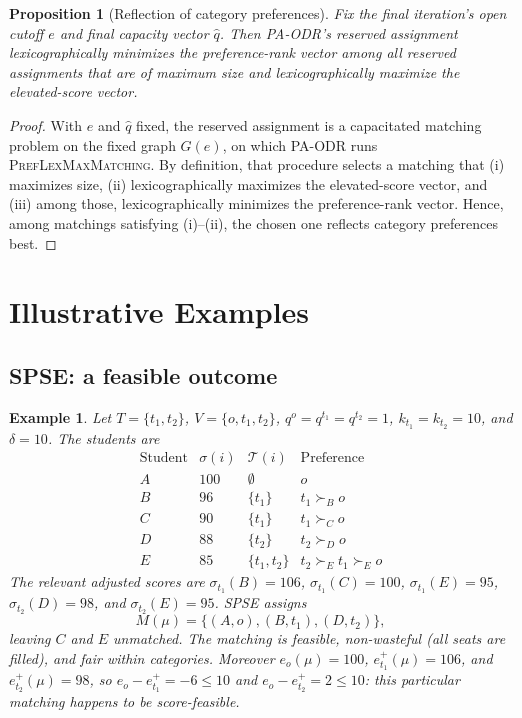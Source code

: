 \documentclass[10pt]{article}
\newtheorem{proposition}{Proposition}
\newtheorem{example}{Example}
\newcommand{\T}{\mathcal{T}}
\newcommand{\1}{\mathbf{1}}
\begin{document}
\begin{proposition}[Reflection of category preferences]
\label{prop:pa-odr-preference}
Fix the final iteration's open cutoff $e$ and final capacity vector $\hat q$. Then PA-ODR's reserved assignment lexicographically minimizes the preference-rank vector among all reserved assignments that are of maximum size and lexicographically maximize the elevated-score vector.
\end{proposition}

\begin{proof}
With $e$ and $\hat q$ fixed, the reserved assignment is a capacitated matching problem on the fixed graph $G(e)$, on which PA-ODR runs \textsc{PrefLexMaxMatching}. By definition, that procedure selects a matching that (i) maximizes size, (ii) lexicographically maximizes the elevated-score vector, and (iii) among those, lexicographically minimizes the preference-rank vector. Hence, among matchings satisfying (i)--(ii), the chosen one reflects category preferences best.
\end{proof}

\section{Illustrative Examples}

\subsection{SPSE: a feasible outcome}

\begin{example}
Let $T=\{t_1,t_2\}$, $V=\{o,t_1,t_2\}$, $q^o=q^{t_1}=q^{t_2}=1$, $k_{t_1}=k_{t_2}=10$, and $\delta=10$. The students are
\[
\begin{array}{c|c|c|c}
\text{Student} & \sigma(i) & \T(i) & \text{Preference} \\
\hline
A & 100 & \emptyset & o \\
B & 96 & \{t_1\} & t_1\succ_B o \\
C & 90 & \{t_1\} & t_1\succ_C o \\
D & 88 & \{t_2\} & t_2\succ_D o \\
E & 85 & \{t_1,t_2\} & t_2\succ_E t_1\succ_E o
\end{array}
\]
The relevant adjusted scores are $\sigma_{t_1}(B)=106$, $\sigma_{t_1}(C)=100$, $\sigma_{t_1}(E)=95$, $\sigma_{t_2}(D)=98$, and $\sigma_{t_2}(E)=95$. SPSE assigns
\[
M(\mu)=\{(A,o),(B,t_1),(D,t_2)\},
\]
leaving $C$ and $E$ unmatched. The matching is feasible, non-wasteful (all seats are filled), and fair within categories. Moreover $e_o(\mu)=100$, $e_{t_1}^+(\mu)=106$, and $e_{t_2}^+(\mu)=98$, so $e_o-e_{t_1}^+=-6\le 10$ and $e_o-e_{t_2}^+=2\le 10$: this particular matching happens to be score-feasible.
\end{example}
\end{document}
